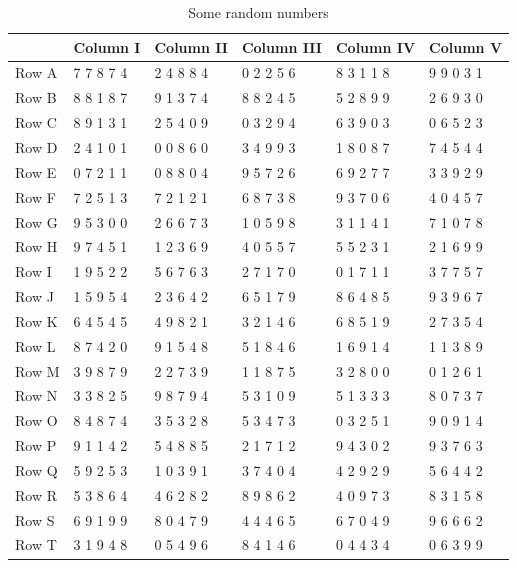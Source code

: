 \documentclass[
  11pt,
  a4paper,
  krantz2]{krantz}
\begin{document}
\begin{table}
\centering
\caption{\label{tab:unnamed-chunk-7}Some random numbers}
\centering
\fontsize{9}{11}\selectfont
\begin{tabular}[t]{llllll}
\toprule
\textbf{ } & \textbf{Column I} & \textbf{Column II} & \textbf{Column III} & \textbf{Column IV} & \textbf{Column V}\\
\midrule
Row A & 7 7 8 7 4 & 2 4 8 8 4 & 0 2 2 5 6 & 8 3 1 1 8 & 9 9 0 3 1\\
Row B & 8 8 1 8 7 & 9 1 3 7 4 & 8 8 2 4 5 & 5 2 8 9 9 & 2 6 9 3 0\\
Row C & 8 9 1 3 1 & 2 5 4 0 9 & 0 3 2 9 4 & 6 3 9 0 3 & 0 6 5 2 3\\
Row D & 2 4 1 0 1 & 0 0 8 6 0 & 3 4 9 9 3 & 1 8 0 8 7 & 7 4 5 4 4\\
Row E & 0 7 2 1 1 & 0 8 8 0 4 & 9 5 7 2 6 & 6 9 2 7 7 & 3 3 9 2 9\\
\addlinespace
Row F & 7 2 5 1 3 & 7 2 1 2 1 & 6 8 7 3 8 & 9 3 7 0 6 & 4 0 4 5 7\\
Row G & 9 5 3 0 0 & 2 6 6 7 3 & 1 0 5 9 8 & 3 1 1 4 1 & 7 1 0 7 8\\
Row H & 9 7 4 5 1 & 1 2 3 6 9 & 4 0 5 5 7 & 5 5 2 3 1 & 2 1 6 9 9\\
Row I & 1 9 5 2 2 & 5 6 7 6 3 & 2 7 1 7 0 & 0 1 7 1 1 & 3 7 7 5 7\\
Row J & 1 5 9 5 4 & 2 3 6 4 2 & 6 5 1 7 9 & 8 6 4 8 5 & 9 3 9 6 7\\
\addlinespace
Row K & 6 4 5 4 5 & 4 9 8 2 1 & 3 2 1 4 6 & 6 8 5 1 9 & 2 7 3 5 4\\
Row L & 8 7 4 2 0 & 9 1 5 4 8 & 5 1 8 4 6 & 1 6 9 1 4 & 1 1 3 8 9\\
Row M & 3 9 8 7 9 & 2 2 7 3 9 & 1 1 8 7 5 & 3 2 8 0 0 & 0 1 2 6 1\\
Row N & 3 3 8 2 5 & 9 8 7 9 4 & 5 3 1 0 9 & 5 1 3 3 3 & 8 0 7 3 7\\
Row O & 8 4 8 7 4 & 3 5 3 2 8 & 5 3 4 7 3 & 0 3 2 5 1 & 9 0 9 1 4\\
\addlinespace
Row P & 9 1 1 4 2 & 5 4 8 8 5 & 2 1 7 1 2 & 9 4 3 0 2 & 9 3 7 6 3\\
Row Q & 5 9 2 5 3 & 1 0 3 9 1 & 3 7 4 0 4 & 4 2 9 2 9 & 5 6 4 4 2\\
Row R & 5 3 8 6 4 & 4 6 2 8 2 & 8 9 8 6 2 & 4 0 9 7 3 & 8 3 1 5 8\\
Row S & 6 9 1 9 9 & 8 0 4 7 9 & 4 4 4 6 5 & 6 7 0 4 9 & 9 6 6 6 2\\
Row T & 3 1 9 4 8 & 0 5 4 9 6 & 8 4 1 4 6 & 0 4 4 3 4 & 0 6 3 9 9\\

\end{tabular}
\end{table}
\end{document}
